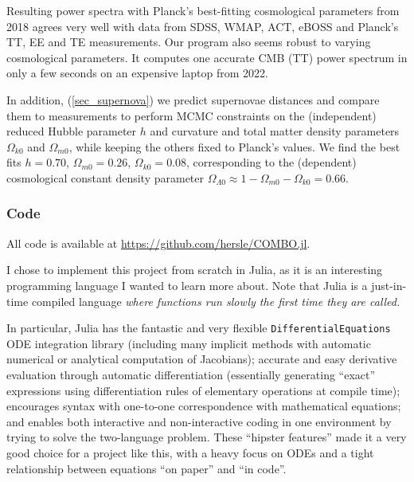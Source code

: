 \documentclass[10pt,a4paper]{article}
\begin{document}
	Resulting power spectra with Planck's best-fitting cosmological parameters from 2018
	agrees very well with data from SDSS, WMAP, ACT, eBOSS and Planck's TT, EE and TE measurements.
	Our program also seems robust to varying cosmological parameters.
	It computes one accurate CMB (TT) power spectrum in only a few seconds on an expensive laptop from 2022.

	In addition, (\ref{sec_supernova})
	we predict supernovae distances and compare them to measurements
	to perform MCMC constraints on the (independent) reduced Hubble parameter $h$ and curvature and total matter density parameters $\Omega_{k0}$ and $\Omega_{m0}$,
	while keeping the others fixed to Planck's values.
	We find the best fits $h = 0.70$, $\Omega_{m0} = 0.26$, $\Omega_{k0} = 0.08$,
	corresponding to the (dependent) cosmological constant density parameter $\Omega_{\Lambda 0} \approx 1 - \Omega_{m0} - \Omega_{k0} = 0.66$.

%


\bigskip \bigskip \bigskip

\subsubsection*{\centering Code}

All code is available at \href{https://github.com/hersle/COMBO.jl}{https://github.com/hersle/COMBO.jl}.

I chose to implement this project from scratch in Julia,
as it is an interesting programming language I wanted to learn more about.
Note that Julia is a just-in-time compiled language
\emph{where functions run slowly the first time they are called.}

In particular, Julia has the fantastic and very flexible \texttt{DifferentialEquations} ODE integration library
(including many implicit methods with automatic numerical or analytical computation of Jacobians);
accurate and easy derivative evaluation through automatic differentiation
(essentially generating ``exact'' expressions using differentiation rules of elementary operations at compile time);
encourages syntax with one-to-one correspondence with mathematical equations;
and enables both interactive and non-interactive coding in one environment by trying to solve the two-language problem.
These ``hipster features'' made it a very good choice for a project like this,
with a heavy focus on ODEs and a tight relationship between equations ``on paper'' and ``in code''.
\end{document}
